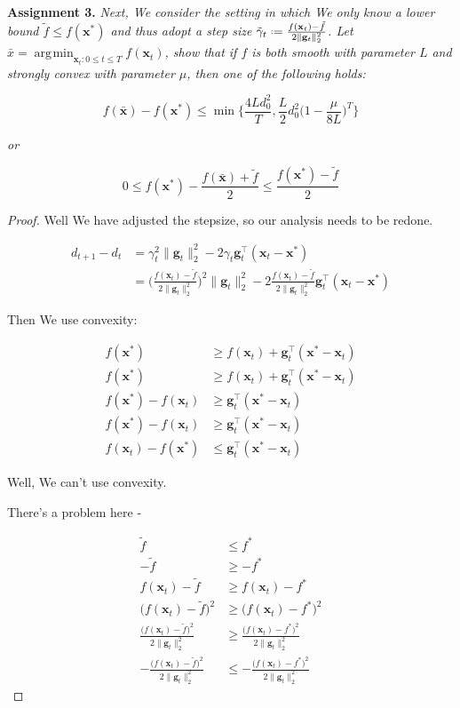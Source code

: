 \documentclass{article}
\DeclareMathOperator*{\argmin}{\arg\!\min}
\newcommand*{\defeq}{\mathrel{\vcenter{\baselineskip0.5ex \lineskiplimit0pt
                     \hbox{\scriptsize.}\hbox{\scriptsize.}}}%
                     =}
\begin{document}
\textbf{Assignment 3.} \textit{Next, We consider the setting in which We only know a lower bound $\tilde{f}\le f(\mathbf{x}^*)$ and thus adopt a step size $\tilde{\gamma}_t \defeq \frac{f(\mathbf{x}_t) - \tilde{f}}{2\|\mathbf{g}_t\|^2_2} $. Let $\bar{x} = \argmin_{\mathbf{x}_t: 0\le t\le T} f(\mathbf{x}_t)$, show that if $f$ is both smooth with parameter $L$ and strongly convex with parameter $\mu$, then one of the following holds: }

\[ f(\bar{\mathbf{x}}) - f(\mathbf{x}^*) \le \min \bigg\{ \frac{4Ld^2_0}{T}, \frac{L}{2}d^2_0\bigg(1-\frac{\mu}{8L}\bigg)^T\bigg\} \]

\textit{or}

\[ 0 \le f(\mathbf{x}^*) - \frac{f(\bar{\mathbf{x}})+\tilde{f}}{2} \le \frac{f(\mathbf{x}^*) - \tilde{f}}{2} \]

\begin{proof}
	
	Well We have adjusted the stepsize, so our analysis needs to be redone. 
	
	\begin{align}
		d_{t+1} - d_t &= \gamma_t^2 \|\mathbf{g}_t\|^2_2 - 2\gamma_t\mathbf{g}_t^\top(\mathbf{x}_t - \mathbf{x}^*)\\
		&= \bigg( \frac{f(\mathbf{x}_t) - \tilde{f}}{2\|\mathbf{g}_t\|^2_2} \bigg)^2 \|\mathbf{g}_t\|^2_2 - 2\frac{f(\mathbf{x}_t) - \tilde{f}}{2\|\mathbf{g}_t\|^2_2}\mathbf{g}_t^\top(\mathbf{x}_t - \mathbf{x}^*)
	\end{align}
	
	Then We use convexity:
	
	\begin{align}
		f(\mathbf{x}^*) &\ge f(\mathbf{x}_t) + \mathbf{g}_t^\top(\mathbf{x}^*-\mathbf{x}_t)\\
		f(\mathbf{x}^*) &\ge f(\mathbf{x}_t) + \mathbf{g}_t^\top(\mathbf{x}^*-\mathbf{x}_t)\\
		f(\mathbf{x}^*) -  f(\mathbf{x}_t) &\ge \mathbf{g}_t^\top(\mathbf{x}^*-\mathbf{x}_t)\\
		f(\mathbf{x}^*) -  f(\mathbf{x}_t) &\ge \mathbf{g}_t^\top(\mathbf{x}^*-\mathbf{x}_t)\\
		f(\mathbf{x}_t) - f(\mathbf{x}^*) &\le \mathbf{g}_t^\top(\mathbf{x}^* - \mathbf{x}_t)
	\end{align}
	
	Well, We can't use convexity. 
	
	There's a problem here - 
	
	\begin{align}
		\tilde{f} &\le f^*\\
		-\tilde{f} &\ge -f^*\\
		f(\mathbf{x}_t)-\tilde{f} &\ge f(\mathbf{x}_t)-f^*\\
		\big(f(\mathbf{x}_t)-\tilde{f}\big)^2 &\ge \big(f(\mathbf{x}_t)-f^*\big)^2\\
		\frac{\big(f(\mathbf{x}_t)-\tilde{f}\big)^2 }{2 \|\mathbf{g}_t\|^2_2} &\ge \frac{\big(f(\mathbf{x}_t)-f^*\big)^2}{2\|\mathbf{g}_t\|^2_2}\\
		-\frac{\big(f(\mathbf{x}_t)-\tilde{f}\big)^2 }{2 \|\mathbf{g}_t\|^2_2} &\le -\frac{\big(f(\mathbf{x}_t)-f^*\big)^2}{2\|\mathbf{g}_t\|^2_2}
	\end{align}
	

\end{proof}
\end{document}
